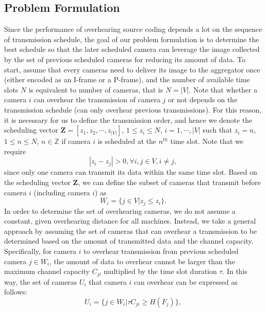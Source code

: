 \subsection{Problem Formulation}
Since the performance of overhearing source coding depends a lot on the sequence of transmission schedule, the goal of our problem formulation is to determine the best schedule so that the later scheduled camera can leverage the image collected by the set of previous scheduled cameras for reducing its amount of data.
To start, assume that every cameras need to deliver its image to the aggregator once (either encoded as an I-frame or a P-frame), and the number of available time slots $N$ is equivalent to number of cameras, that is ${N=|V|}$.
Note that whether a camera $i$ can overhear the transmission of camera $j$ or not depends on the transmission schedule (can only overhear previous transmissions).
For this reason, it is necessary for us to define the transmission order, and hence we denote the scheduling vector ${\mathbf{Z} = [z_1, z_2, \cdots, z_{|V|}]}$, ${1 \leq z_i \leq N}$, ${i=1,\cdots,|V|}$ such that ${z_i = n}$, ${1 \leq n \leq N}$, ${n \in \mathbb{Z}}$ if camera $i$ is scheduled at the $n^{th}$ time slot.
Note that we require
\begin{equation}
|z_i - z_j| > 0, \forall i,j \in V, i \neq j,
\label{eq::oneSlotOneCam}
\end{equation}
since only one camera can transmit its data within the same time slot.
Based on the scheduling vector $\mathbf{Z}$, we can define the subset of cameras that transmit before camera $i$ (including camera $i$) as
\begin{equation}
W_i = \{ j \in V | z_j \leq z_i \}.
\label{eq::prevSet}
\end{equation}
In order to determine the set of overhearing cameras, we do not assume a constant, given overhearing distance for all machines.
Instead, we take a general approach by assuming the set of cameras that can overhear a transmission to be determined based on the amount of transmitted data and the channel capacity.
Specifically, for camera $i$ to overhear transmission from previous scheduled camera $j \in W_i$, the amount of data to overhear cannot be larger than the maximum channel capacity $C_{ji}$ multiplied by the time slot duration $\tau$.
In this way, the set of cameras $U_i$ that camera $i$ can overhear can be expressed as follows:
\begin{equation}
U_i = \{ j \in W_i | \tau C_{ji} \geq H(F_j) \},
\label{eq::overSet}
\end{equation}
